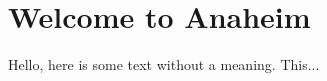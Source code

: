 \documentclass[../main.tex]{subfiles}
\begin{document}
\section{Welcome to Anaheim}
 
Hello, here is some text without a meaning.  This... 
\end{document}
